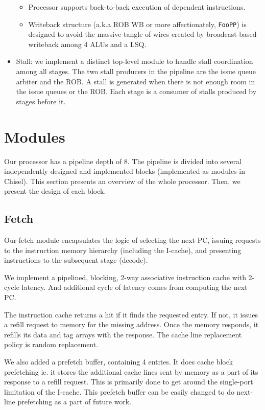 \documentclass{article}
\begin{document}
\begin{itemize}
        \begin{itemize}
            \item Processor supports back-to-back execution of dependent
                instructions.
            \item Writeback structure (a.k.a ROB WB or more affectionately,
                \texttt{FooPP}) is designed to avoid the massive tangle of wires
                created by broadcast-based writeback among 4 ALUs and a LSQ.
        \end{itemize}
    \item Stall: we implement a distinct top-level module to handle stall
        coordination among all stages. The two stall producers in the pipeline
        are the issue queue arbiter and the ROB. A stall is generated when there
        is not enough room in the issue queues or the ROB. Each stage is a
        consumer of stalls produced by stages before it.
\end{itemize}

\section{Modules}

Our processor has a pipeline depth of 8. The pipeline is divided into several
independently designed and implemented blocks (implemented as modules in
Chisel). This section presents an overview of the whole processor. Then, we
present the design of each block.

\subsection{Fetch}

Our fetch module encapsulates the logic of selecting the next PC, issuing
requests to the instruction memory hierarchy (including the I-cache), and presenting
instructions to the subsequent stage (decode).

We implement a pipelined, blocking, 2-way associative instruction cache with
2-cycle latency. And additional cycle of latency comes from computing the next
PC.

The instruction cache returns a hit if it finds the requested entry. If not, it
issues a refill request to memory for the missing address. Once the memory
responds, it refills its data and tag arrays with the response. The cache line
replacement policy is random replacement.  

We also added a prefetch buffer, containing 4 entries. It does cache block
prefetching ie. it stores the additional cache lines sent by memory as a part
of its response to a refill request. This is primarily done to get around the
single-port limitation of the I-cache. This prefetch buffer can be easily
changed to do next-line prefetching as a part of future work.
\end{document}
